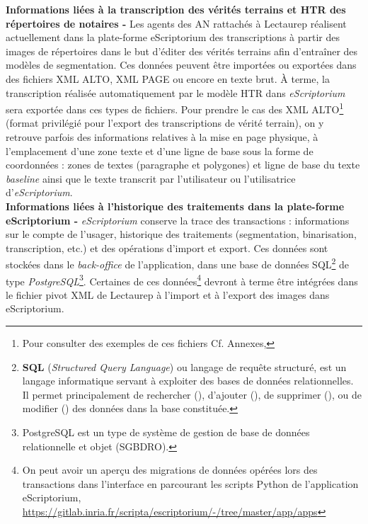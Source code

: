 \textbf{Informations liées à la transcription des vérités terrains et HTR des répertoires de notaires -} 
Les agents des AN rattachés à Lectaurep réalisent actuellement dans la plate-forme eScriptorium des transcriptions à partir des images de répertoires dans le but d'éditer des vérités terrains afin d'entraîner des modèles de segmentation. Ces données peuvent être importées ou exportées dans des fichiers XML ALTO, XML PAGE ou encore en texte brut. À terme, la transcription réalisée automatiquement par le modèle HTR dans \textit{eScriptorium} sera exportée dans ces types de fichiers. Pour prendre le cas des XML ALTO\footnote{Pour consulter des exemples de ces fichiers Cf. Annexes, } (format privilégié pour l'export des transcriptions de vérité terrain), on y retrouve parfois des informations relatives à la mise en page physique, à l'emplacement d'une zone texte et d'une ligne de base sous la forme de coordonnées : zones de textes (paragraphe et polygones) et ligne de base du texte \textit{baseline} ainsi que le texte transcrit par l'utilisateur ou l'utilisatrice d'\textit{eScriptorium}.\\

\textbf{Informations liées à l'historique des traitements dans la plate-forme eScriptorium -} \textit{eScriptorium} conserve la trace des transactions  : informations sur le compte de l'usager, historique des traitements (segmentation, binarisation, transcription, etc.) et des opérations d'import et export. Ces données sont stockées dans le \textit{back-office} de l'application, dans une base de données SQL\footnote{\textbf{SQL} (\textit{Structured Query Language}) ou langage de requête structuré, est un langage informatique servant à exploiter des bases de données relationnelles. Il permet principalement de rechercher (), d'ajouter (), de supprimer (), ou de modifier () des données dans la base constituée.} de type \textit{PostgreSQL}\footnote{PostgreSQL est un type de système de gestion de base de données relationnelle et objet (SGBDRO).}. Certaines de ces données\footnote{On peut avoir un aperçu des migrations de données opérées lors des transactions dans l'interface en parcourant les scripts Python de l'application eScriptorium, \url{https://gitlab.inria.fr/scripta/escriptorium/-/tree/master/app/apps}} devront à terme  être intégrées dans le fichier pivot XML de Lectaurep à l'import et à l'export des images dans eScriptorium.\\

